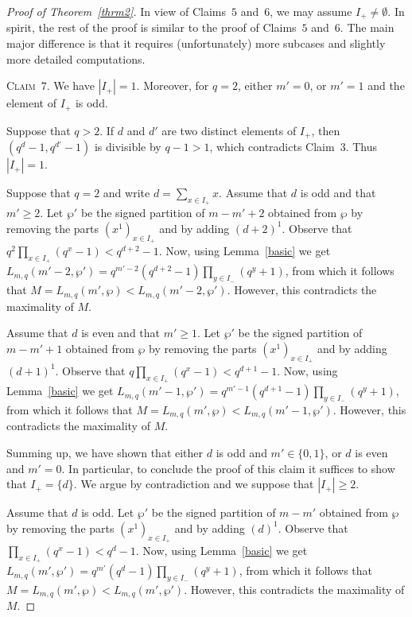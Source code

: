 \documentclass{amsart}
\begin{document}
\begin{proof}[Proof of Theorem~\ref{thrm2}]
\smallskip

In view of Claims~$5$ and~$6$, we may assume $I_+\neq\emptyset$. In spirit, the rest of the proof is similar to the proof of Claims~$5$ and~$6$. The main major difference is that it requires (unfortunately) more subcases and slightly more detailed computations. 

\smallskip

\noindent\textsc{Claim~$7$. }We have $|I_+|=1$. Moreover, for $q=2$, either $m'=0$, or $m'=1$ and the element of $I_+$ is odd.

\smallskip

\noindent  Suppose that $q>2$. If $d$ and $d'$ are two distinct elements of $I_{+}$, then $(q^{d}-1,q^{d'}-1)$ is divisible by $q-1>1$, which contradicts Claim~$3$.  Thus $|I_+|=1$.

Suppose that $q=2$ and write $d=\sum_{x\in I_+}x$. 
Assume that $d$ is odd and that $m'\geq 2$. Let $\wp'$ be the signed partition of $m-m'+2$ obtained from $\wp$ by removing the parts $(x^1)_{x\in I_+}$ and by adding $(d+2)^1$. Observe that $q^2\prod_{x\in I_+}(q^x-1)<q^{d+2}-1$. Now, using Lemma~\ref{basic} we get $L_{m,q}(m'-2,\wp')=q^{m'-2}(q^{d+2}-1)\prod_{y\in I_-}(q^y+1)$, from which it follows that $M=L_{m,q}(m',\wp)<L_{m,q}(m'-2,\wp')$. However, this contradicts the maximality of $M$. 

Assume that $d$ is even and that $m'\geq 1$. Let $\wp'$ be the signed partition of $m-m'+1$ obtained from $\wp$ by removing the parts $(x^1)_{x\in I_+}$ and by adding $(d+1)^1$. Observe that $q\prod_{x\in I_+}(q^x-1)<q^{d+1}-1$. Now, using Lemma~\ref{basic} we get $L_{m,q}(m'-1,\wp')=q^{m'-1}(q^{d+1}-1)\prod_{y\in I_-}(q^y+1)$, from which it follows that $M=L_{m,q}(m',\wp)<L_{m,q}(m'-1,\wp')$. However, this contradicts the maximality of $M$. 

Summing up, we have shown that either $d$ is odd and $m'\in \{0,1\}$, or $d$ is even and $m'=0$. In particular, to conclude the proof of this claim it suffices to show that $I_+=\{d\}$. We argue by contradiction and we suppose that $|I_+|\geq 2$. 

Assume that $d$ is odd. Let $\wp'$ be the signed partition of $m-m'$ obtained from $\wp$ by removing the parts $(x^1)_{x\in I_+}$ and by adding $(d)^1$. Observe that $\prod_{x\in I_+}(q^x-1)<q^{d}-1$. Now, using Lemma~\ref{basic} we get $L_{m,q}(m',\wp')=q^{m'}(q^{d}-1)\prod_{y\in I_-}(q^y+1)$, from which it follows that $M=L_{m,q}(m',\wp)<L_{m,q}(m',\wp')$. However, this contradicts the maximality of $M$. 


\end{proof}
\end{document}
